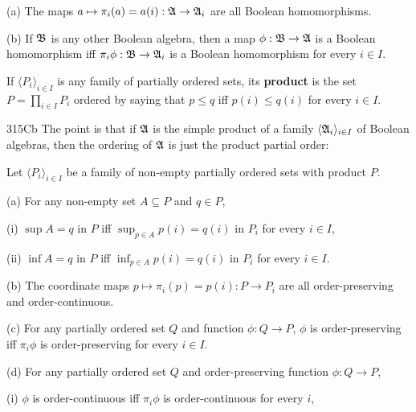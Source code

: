 (a) The maps $a\mapsto \pi_i(a)=a(i):\frak A\to\frak A_i$ are all
Boolean homomorphisms.

(b) If $\frak B$ is any other Boolean algebra, then a map
$\phi:\frak B\to\frak A$ is a Boolean homomorphism iff
$\pi_i\phi:\frak B\to\frak A_i$ is a Boolean homomorphism for every $i\in I$.


If $\langle P_i\rangle_{i\in I}$ is any family of partially ordered sets, 
its {\bf product} is the set $P=\prod_{i\in I}P_i$ ordered by saying that 
$p\le q$ iff $p(i)\le q(i)$ for every $i\in I$.

\spheader 315Cb The point is that if $\frak A$ is the simple
product of a family $\langle\frak A_i\rangle_{i\in I}$ of Boolean
algebras, then the ordering of $\frak A$ is just the product partial
order:



 Let $\langle P_i\rangle_{i\in I}$ be a family
of non-empty partially ordered sets with product $P$.

(a) For any non-empty set $A\subseteq P$ and $q\in P$,

\quad (i) $\sup A=q$ in $P$ iff $\sup_{p\in A}p(i)=q(i)$ in $P_i$ for
every $i\in I$,

\quad (ii) $\inf A=q$ in $P$ iff $\inf_{p\in A}p(i)=q(i)$ in $P_i$ for
every $i\in I$.

(b) The coordinate maps $p\mapsto\pi_i(p)=p(i):P\to P_i$ are all
order-preserving and order-continuous.

(c) For any partially ordered set $Q$ and function $\phi:Q\to P$,
$\phi$ is order-preserving iff $\pi_i\phi$ is order-preserving for every
$i\in I$.

(d) For any partially ordered set $Q$ and order-preserving function
$\phi:Q\to P$,

\quad (i) $\phi$ is order-continuous iff $\pi_i\phi$ is order-continuous
for every $i$,

